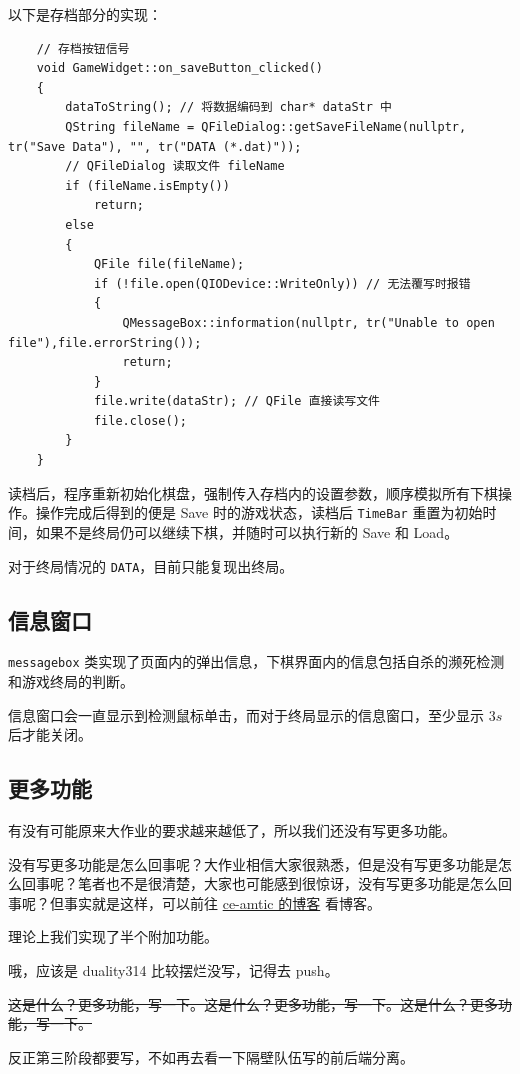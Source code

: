 \documentclass{noithesis}
\begin{document}
	以下是存档部分的实现：
	
	\begin{lstlisting}
	// 存档按钮信号
	void GameWidget::on_saveButton_clicked()
	{
		dataToString(); // 将数据编码到 char* dataStr 中
		QString fileName = QFileDialog::getSaveFileName(nullptr, tr("Save Data"), "", tr("DATA (*.dat)"));
		// QFileDialog 读取文件 fileName
		if (fileName.isEmpty())
			return;
		else
		{
			QFile file(fileName);
			if (!file.open(QIODevice::WriteOnly)) // 无法覆写时报错
			{
				QMessageBox::information(nullptr, tr("Unable to open file"),file.errorString());
				return;
			}
			file.write(dataStr); // QFile 直接读写文件
			file.close();
		}
	}
	\end{lstlisting}
	
	读档后，程序重新初始化棋盘，强制传入存档内的设置参数，顺序模拟所有下棋操作。操作完成后得到的便是 Save 时的游戏状态，读档后 \verb|TimeBar| 重置为初始时间，如果不是终局仍可以继续下棋，并随时可以执行新的 Save 和 Load。
	
	对于终局情况的 \verb|DATA|，目前只能复现出终局。
	
	\subsection{信息窗口}
	
	\verb|messagebox| 类实现了页面内的弹出信息，下棋界面内的信息包括自杀的濒死检测和游戏终局的判断。
	
	信息窗口会一直显示到检测鼠标单击，而对于终局显示的信息窗口，至少显示 $3s$ 后才能关闭。
	
	\subsection{更多功能}
	
	有没有可能原来大作业的要求越来越低了，所以我们还没有写更多功能。
	
	没有写更多功能是怎么回事呢？大作业相信大家很熟悉，但是没有写更多功能是怎么回事呢？笔者也不是很清楚，大家也可能感到很惊讶，没有写更多功能是怎么回事呢？但事实就是这样，可以前往 \href{https://ce-amtic.github.io/}{ce-amtic 的博客} 看博客。
	
	理论上我们实现了半个附加功能。
	
	哦，应该是 duality314 比较摆烂没写，记得去 push。
	
	\sout{这是什么？更多功能，写一下。这是什么？更多功能，写一下。这是什么？更多功能，\newline 写一下。}
	
	反正第三阶段都要写，不如再去看一下隔壁队伍写的前后端分离。
	
\end{document}

